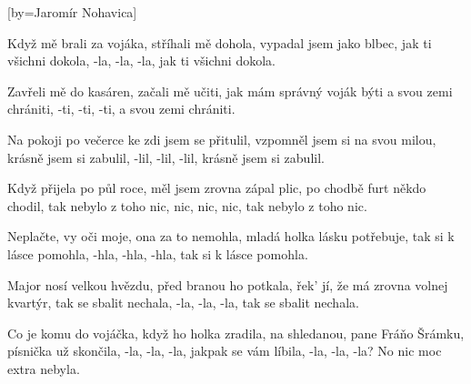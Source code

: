[by={Jaromír Nohavica}]

\beginverse{}
Když mě brali za vojáka, stříhali mě dohola,
vypadal jsem jako blbec,
jak ti všichni dokola, -la, -la, -la,
jak ti všichni dokola.
\endverse{}

\beginverse{}
Zavřeli mě do kasáren, začali mě učiti,
jak mám správný voják býti
a svou zemi chrániti, -ti, -ti, -ti,
a svou zemi chrániti.
\endverse{}

\beginverse{}
Na pokoji po večerce ke zdi jsem se přitulil,
vzpomněl jsem si na svou milou,
krásně jsem si zabulil, -lil, -lil, -lil,
krásně jsem si zabulil.
\endverse{}

\beginverse{}
Když přijela po půl roce, měl jsem zrovna zápal plic,
po chodbě furt někdo chodil,
tak nebylo z toho nic, nic, nic, nic,
tak nebylo z toho nic.
\endverse{}

\beginverse{}
Neplačte, vy oči moje, ona za to nemohla,
mladá holka lásku potřebuje,
tak si k lásce pomohla, -hla, -hla, -hla,
tak si k lásce pomohla.
\endverse{}

\beginverse{}
Major nosí velkou hvězdu, před branou ho potkala,
řek' jí, že má zrovna volnej kvartýr,
tak se sbalit nechala, -la, -la, -la,
tak se sbalit nechala.
\endverse{}

\beginverse{}
Co je komu do vojáčka, když ho holka zradila,
na shledanou, pane Fráňo Šrámku,
písnička už skončila, -la, -la, -la,
jakpak se vám líbila, -la, -la, -la?
No nic moc extra nebyla.
\endverse{}

\endsong{}
